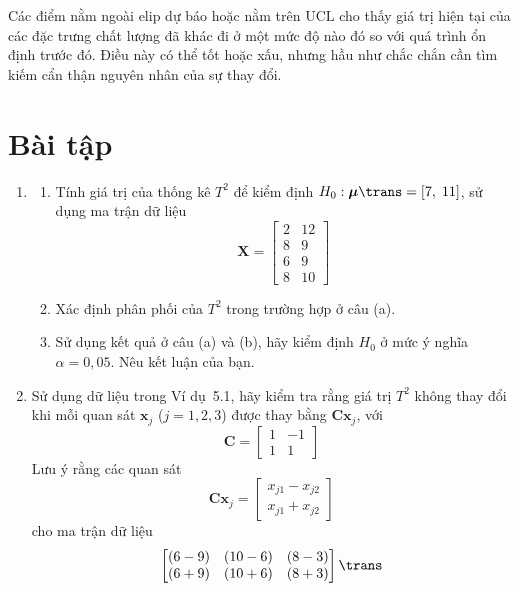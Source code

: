 Các điểm nằm ngoài elip dự báo hoặc nằm trên $\mathrm{UCL}$ cho thấy giá trị hiện tại của các đặc trưng chất lượng đã khác đi ở một mức độ nào đó so với quá trình ổn định trước đó. Điều này có thể tốt hoặc xấu, nhưng hầu như chắc chắn cần tìm kiếm cẩn thận nguyên nhân của sự thay đổi.


\section*{Bài tập}

\begin{enumerate}[label=\textbf{5.\arabic*.}, leftmargin=2.8em]
    \item
    \begin{enumerate}[label=(\alph*)]
        \item Tính giá trị của thống kê $T^2$ để kiểm định $H_0: \boldsymbol{\mu}\trans = [7,\; 11]$, sử dụng ma trận dữ liệu
        \[
            \mathbf{X} =
            \begin{bmatrix}
                2 & 12 \\
                8 & 9 \\
                6 & 9 \\
                8 & 10
            \end{bmatrix}
        \]
        \item Xác định phân phối của $T^2$ trong trường hợp ở câu (a).
        \item Sử dụng kết quả ở câu (a) và (b), hãy kiểm định $H_0$ ở mức ý nghĩa $\alpha = 0{,}05$. Nêu kết luận của bạn.
    \end{enumerate}

    \item Sử dụng dữ liệu trong Ví dụ~5.1, hãy kiểm tra rằng giá trị $T^2$ không thay đổi khi mỗi quan sát $\mathbf{x}_j$ ($j = 1, 2, 3$) được thay bằng $\mathbf{C}\mathbf{x}_j$, với
    \[
        \mathbf{C} =
        \begin{bmatrix}
            1 & -1 \\
            1 & 1
        \end{bmatrix}
    \]
    Lưu ý rằng các quan sát
    \[
        \mathbf{C}\mathbf{x}_j =
        \begin{bmatrix}
            x_{j1} - x_{j2} \\
            x_{j1} + x_{j2}
        \end{bmatrix}
    \]
    cho ma trận dữ liệu
    \[
        \begin{bmatrix}
            (6 - 9) & (10 - 6) & (8 - 3) \\
            (6 + 9) & (10 + 6) & (8 + 3)
        \end{bmatrix}\trans
    \]


\end{enumerate}
